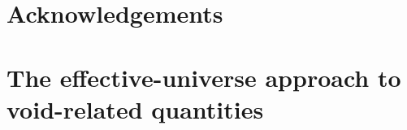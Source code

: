 \documentclass[twocolumn,amsfont,amssymb,amsmath, showpacs,balancelastpage, nofootinbib]{revtex4-1}
\begin{document}
    \cite{2017JCAP...07..014H}
    \cite{2017MNRAS.469..787P}
    \cite{2014PhRvL.112y1302H}
    \cite{2014MNRAS.442..462S}
    \cite{2016IAUS..308..542N}

\section*{Acknowledgements}
  \lipsum[5]
  


\appendix
\onecolumngrid
\section{The effective-universe approach to void-related quantities}\label{app:effu}
  \lipsum[6]
\end{document}
